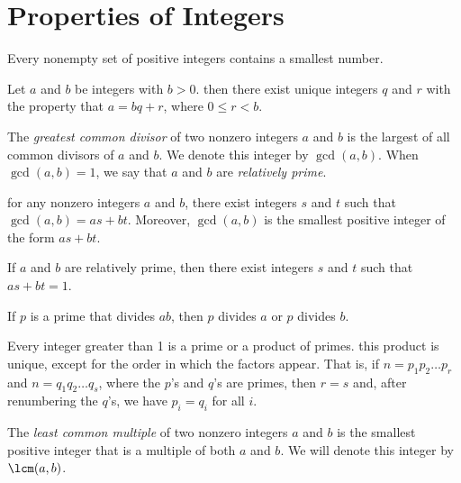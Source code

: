 \section{Properties of Integers}
\begin{aside}
	Every nonempty set of positive integers contains a smallest number.
\end{aside}

\begin{theorem}
	Let $a$ and $b$ be integers with $b > 0$. then there exist unique integers $q$ and $r$ with the property that $a = bq + r$, where $0 \leq r < b$.
\end{theorem}

\begin{definition}
	The \textit{greatest common divisor} of two nonzero integers $a$ and $b$ is the largest of all common divisors of $a$ and $b$. We denote this integer by $\gcd(a, b)$. When $\gcd(a, b) = 1$, we say that $a$ and $b$ are \textit{relatively prime}.
\end{definition}

\begin{theorem}
	for any nonzero integers $a$ and $b$, there exist integers $s$ and $t$ such that $\gcd(a, b)=as+bt$. Moreover, $\gcd(a,b)$ is the smallest positive integer of the form $as + bt$.
\end{theorem}

\begin{corollary}
	If $a$ and $b$ are relatively prime, then there exist integers $s$ and $t$ such that $as + bt = 1$.
\end{corollary}

\begin{lemma}
	If $p$ is a prime that divides $ab$, then $p$ divides $a$ or $p$ divides $b$.
\end{lemma}

\begin{theorem}
	Every integer greater than 1 is a prime or a product of primes. this product is unique, except for the order in which the factors appear. That is, if $n = p_1p_2\dots p_r$ and $n=q_1q_2\dots q_s$, where the $p$'s and $q$'s are primes, then $r = s$ and, after renumbering the $q$'s, we have $p_i = q_i$ for all $i$.
\end{theorem}

\begin{definition}
	The \textit{least common multiple} of two nonzero integers $a$ and $b$ is the smallest positive integer that is a multiple of both $a$ and $b$. We will denote this integer by $\lcm(a, b)$.
\end{definition}

